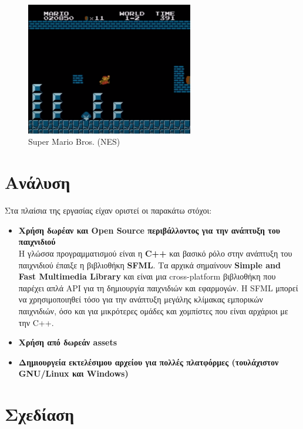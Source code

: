 \documentclass[12pt]{article}
\begin{document}
 	\begin{figure}[H]
	\centering
	\includegraphics[width=0.65\textwidth]{mario.png}
	\caption{Super Mario Bros. (NES)}
	\label{fig:mario}
	\end{figure}
	

	
	\section{Ανάλυση}
	
	
	Στα πλαίσια της εργασίας είχαν οριστεί οι παρακάτω στόχοι:
	
	\begin{itemize}
		\item \textbf{Χρήση δωρέαν και Open Source περιβάλλοντος για την ανάπτυξη του παιχνιδιού}\\
		Η γλώσσα προγραμματισμού είναι η \textbf{C++} και βασικό ρόλο στην ανάπτυξη του παιχνιδιού έπαιξε η βιβλιοθήκη \textbf{SFML}. Τα αρχικά σημαίνουν \textbf{Simple and Fast Multimedia Library} και είναι μια cross-platform βιβλιοθήκη που παρέχει απλά API για τη δημιουργία παιχνιδιών και εφαρμογών. Η SFML μπορεί να χρησιμοποιηθεί τόσο για την ανάπτυξη μεγάλης κλίμακας εμπορικών παιχνιδιών, όσο και για μικρότερες ομάδες και χομπίστες που είναι αρχάριοι με την C++.
		
		\item \textbf{Χρήση από δωρεάν assets}
		
		\item \textbf{Δημιουργεία εκτελέσιμου αρχείου για πολλές πλατφόρμες (τουλάχιστον GNU/Linux και Windows)}
	\end{itemize}
	
	
	
	
	
	\section{Σχεδίαση}
	
\end{document}
